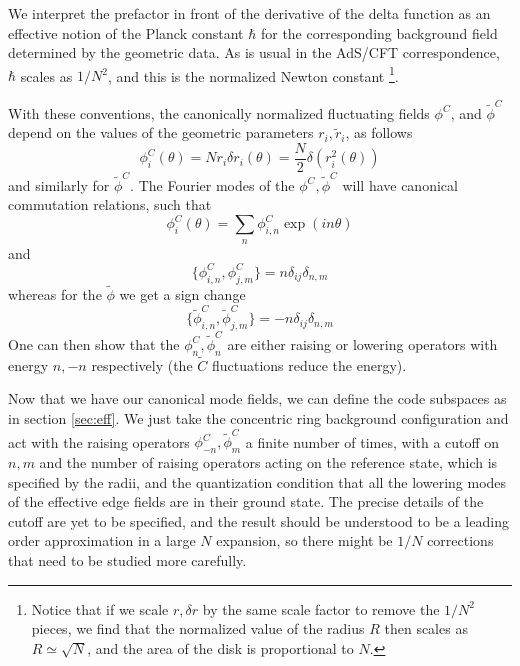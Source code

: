 \documentclass[12pt,nofootinbib, longbibliography]{revtex4-1}
\begin{document}
We interpret the prefactor in front of the derivative of the delta function as an effective notion of the Planck constant $\hbar$ for the corresponding background field determined by the geometric data.  
As is usual in the AdS/CFT correspondence, $\hbar$ scales as $1/N^2$, and this is the  normalized Newton constant \footnote{ Notice that if we scale $r, \delta r$ by the same scale factor to remove the $1/N^2$ pieces, we find that the normalized value of the radius $R$ then scales as $R \simeq \sqrt N$, and the area of the disk is proportional to $N$.}.

With these conventions, the canonically normalized fluctuating fields $\phi^C$, and $\tilde \phi^C$ depend on the values of the geometric parameters $r_i, \tilde r_i$, as follows
\begin{equation}
\phi^C_i (\theta) =  N r_i   \delta r_i(\theta) = \frac N 2 \delta (r_i^2(\theta))
\end{equation}
and similarly for $\tilde \phi^C$. The Fourier modes of the $\phi^C, \tilde \phi^C$ will have canonical commutation relations, such that 
\begin{equation}
\phi^C_i (\theta)= \sum_n \phi^C_{i,n} \exp(i n \theta)
\end{equation}
and 
\begin{equation}
\{ \phi^C_{i,n} , \phi^C_{j,m}\} = n \delta_{ij}\delta_{n,m} 
\end{equation}
whereas for the $\tilde \phi$ we get a sign change
\begin{equation}
\{\tilde  \phi^C_{i,n} ,\tilde  \phi^C_{j,m}\} =- n \delta_{ij}\delta_{n,m} 
\end{equation}
One can then show that the $\phi^C_{n},\tilde \phi^C_n$ are either raising or lowering operators with energy $n, -n$ respectively (the $\tilde C$ fluctuations reduce the energy).


Now that we have our canonical mode fields, we can define the code subspaces as  in section \ref{sec:eff}. We just take the concentric ring background configuration and act with the raising operators $\phi^C_{-n}, \tilde \phi^C_m$ a finite number of times, with a cutoff on $n,m$ and the number of raising operators acting on the reference state, which is specified by the radii, and the quantization condition that all the lowering modes of the effective edge fields are in their ground state. The precise details of the cutoff are yet to be specified, and the result should be understood to be a leading order approximation in a large $N$ expansion, so there might be $1/N$ corrections that need to be studied more carefully.
\end{document}
